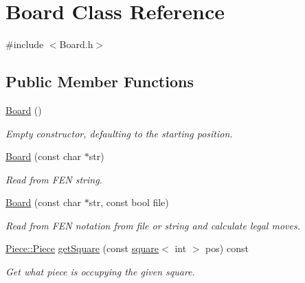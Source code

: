 \hypertarget{classBoard}{}\section{Board Class Reference}
\label{classBoard}


{\ttfamily \#include $<$Board.\+h$>$}

\subsection*{Public Member Functions}
\begin{DoxyCompactItemize}
\item 
\mbox{\label{classBoard_a9ee491d4fea680cf69b033374a9fdfcb}} 
\hyperlink{classBoard_a9ee491d4fea680cf69b033374a9fdfcb}{Board} ()
\begin{DoxyCompactList}\small\item\em Empty constructor, defaulting to the starting position. \end{DoxyCompactList}\item 
\mbox{\label{classBoard_a155259ecd3131cbf8c155c1dd19026b0}} 
\hyperlink{classBoard_a155259ecd3131cbf8c155c1dd19026b0}{Board} (const char $\ast$str)
\begin{DoxyCompactList}\small\item\em Read from F\+EN string. \end{DoxyCompactList}\item 
\hyperlink{classBoard_a8dd2a85d6b43bcab4eaf83e1541aeb18}{Board} (const char $\ast$str, const bool file)
\begin{DoxyCompactList}\small\item\em Read from F\+EN notation from file or string and calculate legal moves. \end{DoxyCompactList}\item 
\mbox{\label{classBoard_a8359f43f59d4eb04c679f0415c26add4}} 
\hyperlink{namespacePiece_a588233307aa6bdb32c1d62c9f20895cc}{Piece\+::\+Piece} \hyperlink{classBoard_a8359f43f59d4eb04c679f0415c26add4}{get\+Square} (const \hyperlink{structsquare}{square}$<$ int $>$ pos) const
\begin{DoxyCompactList}\small\item\em Get what piece is occupying the given square. \end{DoxyCompactList}\item 

\end{DoxyCompactItemize}
